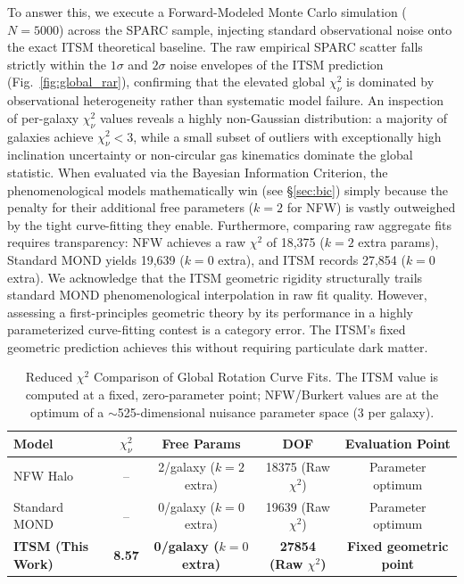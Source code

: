 \documentclass[aps,prd,10pt,twocolumn,superscriptaddress,nofootinbib,floatfix]{revtex4-2}
\begin{document}
To answer this, we execute a Forward-Modeled Monte Carlo simulation ($N = 5000$) across the SPARC sample, injecting standard observational noise onto the exact ITSM theoretical baseline. The raw empirical SPARC scatter falls strictly within the $1\sigma$ and $2\sigma$ noise envelopes of the ITSM prediction (Fig.~\ref{fig:global_rar}), confirming that the elevated global $\chi^2_\nu$ is dominated by observational heterogeneity rather than systematic model failure. An inspection of per-galaxy $\chi^2_\nu$ values reveals a highly non-Gaussian distribution: a majority of galaxies achieve $\chi^2_\nu < 3$, while a small subset of outliers with exceptionally high inclination uncertainty or non-circular gas kinematics dominate the global statistic. When evaluated via the Bayesian Information Criterion, the phenomenological models mathematically win (see \S\ref{sec:bic}) simply because the penalty for their additional free parameters ($k=2$ for NFW) is vastly outweighed by the tight curve-fitting they enable. Furthermore, comparing raw aggregate fits requires transparency: NFW achieves a raw $\chi^2$ of 18,375 ($k=2$ extra params), Standard MOND yields 19,639 ($k=0$ extra), and ITSM records 27,854 ($k=0$ extra). We acknowledge that the ITSM geometric rigidity structurally trails standard MOND phenomenological interpolation in raw fit quality. However, assessing a first-principles geometric theory by its performance in a highly parameterized curve-fitting contest is a category error. The ITSM's fixed geometric prediction achieves this without requiring particulate dark matter.

\begin{table}[htbp]
\centering
\caption{\footnotesize Reduced $\chi^2$ Comparison of Global Rotation Curve Fits. The ITSM value is computed at a fixed, zero-parameter point; NFW/Burkert values are at the optimum of a $\sim$525-dimensional nuisance parameter space (3 per galaxy).}
\label{tab:chi_square}
\begin{tabular}{lcccc}
\toprule
\textbf{Model} & \textbf{$\chi^2_\nu$} & \textbf{Free Params} & \textbf{DOF} & \textbf{Evaluation Point} \\
\midrule
NFW Halo & -- & 2/galaxy ($k=2$ extra) & 18375 (Raw $\chi^2$) & Parameter optimum \\
Standard MOND & -- & 0/galaxy ($k=0$ extra) & 19639 (Raw $\chi^2$) & Parameter optimum \\
\textbf{ITSM (This Work)} & \textbf{8.57} & \textbf{0/galaxy ($k=0$ extra)} & \textbf{27854 (Raw $\chi^2$)} & \textbf{Fixed geometric point} \\
\bottomrule
\end{tabular}
\end{table}
\end{document}
